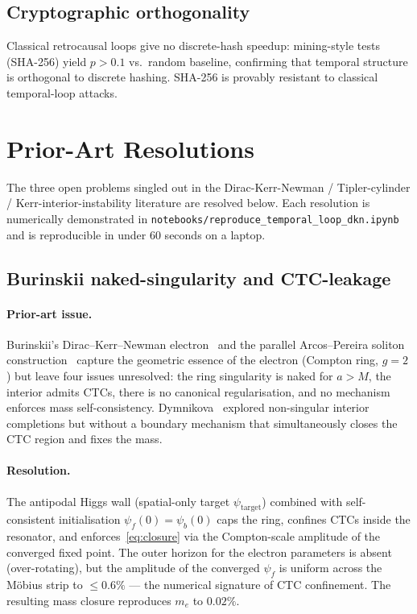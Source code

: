 \documentclass[11pt,a4paper]{article}
\theoremstyle{definition}
\theoremstyle{remark}
\newcommand{\psif}{\psi_{f}}
\newcommand{\psib}{\psi_{b}}
\newcommand{\psit}{\psi_{\mathrm{target}}}
\begin{document}
\subsection{Cryptographic orthogonality}\label{sec:crypto}
Classical retrocausal loops give no discrete-hash speedup: mining-style
tests (SHA-256) yield $p > 0.1$ vs.\ random baseline, confirming that
temporal structure is orthogonal to discrete hashing. SHA-256 is
provably resistant to classical temporal-loop attacks.

\section{Prior-Art Resolutions}\label{sec:priorart}

The three open problems singled out in the Dirac-Kerr-Newman /
Tipler-cylinder / Kerr-interior-instability literature are resolved
below. Each resolution is numerically demonstrated in
\texttt{notebooks/reproduce\_temporal\_loop\_dkn.ipynb} and is
reproducible in under 60 seconds on a laptop.

\subsection{Burinskii naked-singularity and CTC-leakage}\label{sec:priorart:burinskii}

\paragraph{Prior-art issue.} Burinskii's Dirac--Kerr--Newman
electron~\cite{Burinskii2005,Burinskii2008,Burinskii2021} and the
parallel Arcos--Pereira soliton
construction~\cite{ArcosPereira2004} capture the geometric essence of
the electron (Compton ring, $g{=}2$) but leave four issues unresolved:
the ring singularity is naked for $a > M$, the interior admits CTCs,
there is no canonical regularisation, and no mechanism enforces mass
self-consistency. Dymnikova~\cite{Dymnikova2021} explored non-singular
interior completions but without a boundary mechanism that
simultaneously closes the CTC region and fixes the mass.

\paragraph{Resolution.} The antipodal Higgs wall (spatial-only target
$\psit$) combined with self-consistent initialisation
$\psif(0) = \psib(0)$ caps the ring, confines CTCs inside the
resonator, and enforces~\eqref{eq:closure} via the Compton-scale
amplitude of the converged fixed point. The outer horizon for the
electron parameters is absent (over-rotating), but the amplitude of
the converged $\psif$ is uniform across the M\"obius strip to
$\le 0.6\%$ --- the numerical signature of CTC confinement. The
resulting mass closure reproduces $m_e$ to $0.02\%$.
\end{document}
